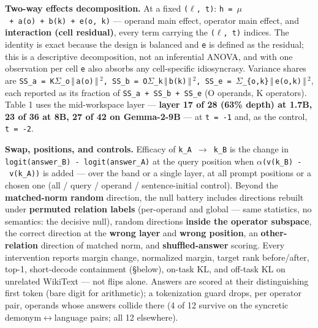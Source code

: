 \textbf{Two-way effects decomposition.} At a fixed \texttt{(\ensuremath{\ell},\ t)}:
\texttt{h\ =\ \ensuremath{\mu}\ +\ a(o)\ +\ b(k)\ +\ e(o,\ k)} --- operand main effect,
operator main effect, and \textbf{interaction (cell residual)}, every
term carrying the \texttt{(\ensuremath{\ell},\ t)} indices. The identity is exact
because the design is balanced and \texttt{e} is defined as the
residual; this is a descriptive decomposition, not an inferential ANOVA,
and with one observation per cell \texttt{e} also absorbs any
cell-specific idiosyncrasy. Variance shares are
\texttt{SS\_a\ =\ K\textperiodcentered{}\ensuremath{\Sigma}\_o\ensuremath{\,\Vert\,}a(o)\ensuremath{\,\Vert\,}\ensuremath{^{2}},\ SS\_b\ =\ O\textperiodcentered{}\ensuremath{\Sigma}\_k\ensuremath{\,\Vert\,}b(k)\ensuremath{\,\Vert\,}\ensuremath{^{2}},\ SS\_e\ =\ \ensuremath{\Sigma}\_\{o,k\}\ensuremath{\,\Vert\,}e(o,k)\ensuremath{\,\Vert\,}\ensuremath{^{2}}},
each reported as its fraction of \texttt{SS\_a\ +\ SS\_b\ +\ SS\_e} (O
operands, K operators). Table 1 uses the mid-workspace layer ---
\textbf{layer 17 of 28 (63\% depth) at 1.7B, 23 of 36 at 8B, 27 of 42 on
Gemma-2-9B} --- at \texttt{t\ =\ -1} and, as the control,
\texttt{t\ =\ -2}.

\textbf{Swap, positions, and controls.} Efficacy of
\texttt{k\_A\ \ensuremath{\to}\ k\_B} is the change in
\texttt{logit(answer\_B)\ -\ logit(answer\_A)} at the query position
when \texttt{\ensuremath{\alpha}\textperiodcentered{}(v(k\_B)\ -\ v(k\_A))} is added --- over the band or a
single layer, at all prompt positions or a chosen one (all / query /
operand / sentence-initial control). Beyond the \textbf{matched-norm
random} direction, the null battery includes directions rebuilt under
\textbf{permuted relation labels} (per-operand and global --- same
statistics, no semantics: the decisive null), random directions
\textbf{inside the operator subspace}, the correct direction at the
\textbf{wrong layer} and \textbf{wrong position}, an
\textbf{other-relation} direction of matched norm, and
\textbf{shuffled-answer} scoring. Every intervention reports margin
change, normalized margin, target rank before/after, top-1, short-decode
containment (\S{}below), on-task KL, and off-task KL on unrelated WikiText
--- not flips alone. Answers are scored at their distinguishing first
token (bare digit for arithmetic); a tokenization guard drops, per
operator pair, operands whose answers collide there (4 of 12 survive on
the syncretic demonym\ensuremath{\leftrightarrow}language pairs; all 12 elsewhere).


